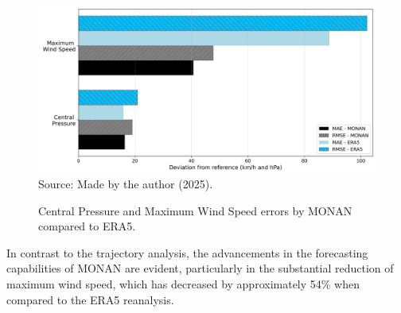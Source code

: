 \begin{figure}[!ht]
	\centering
	\caption{Central Pressure and Maximum Wind Speed errors by MONAN compared to ERA5.} %
	\includegraphics[width=\textwidth]{docs/figuras/chapter5/barplot_mean_error_monan_era5_intensity_FINAL.png} 
	\vspace{0.5em}
	Source: Made by the author (2025).  %
	\label{fig:errorsmona} %
\end{figure}

In contrast to the trajectory analysis, the advancements in the forecasting capabilities of MONAN are evident, particularly in the substantial reduction of maximum wind speed, which has decreased by approximately 54\% when compared to the ERA5 reanalysis.













